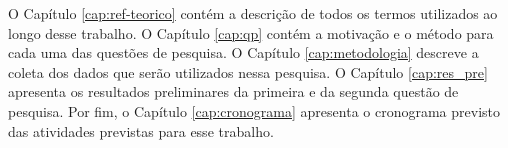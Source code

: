 O Capítulo \ref{cap:ref-teorico} contém a descrição de todos os termos utilizados ao longo desse trabalho. O Capítulo \ref{cap:qp} contém a motivação e o método para cada uma das questões de pesquisa. O Capítulo \ref{cap:metodologia} descreve a coleta dos dados que serão utilizados nessa pesquisa. O Capítulo \ref{cap:res_pre} apresenta os resultados preliminares da primeira e da segunda questão de pesquisa. Por fim, o Capítulo \ref{cap:cronograma} apresenta o cronograma previsto das atividades previstas para esse trabalho.


